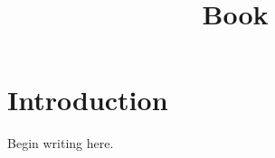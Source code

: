 \documentclass{book}
\title{Book}
\author{}
\date{}
\begin{document}
\maketitle
\chapter{Introduction}
Begin writing here.
\end{document}

